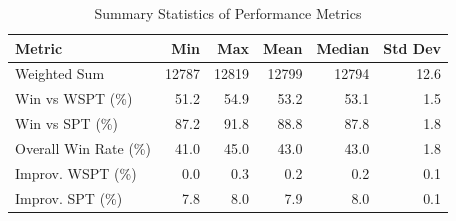 \begin{table}[htbp]%
\centering%
\begin{tabular}{lrrrrr}%
\toprule%
\textbf{Metric}&\textbf{Min}&\textbf{Max}&\textbf{Mean}&\textbf{Median}&\textbf{Std Dev}\\%
\midrule%
Weighted Sum&12787&12819&12799&12794&12.6\\%
Win vs WSPT (\%)&51.2&54.9&53.2&53.1&1.5\\%
Win vs SPT (\%)&87.2&91.8&88.8&87.8&1.8\\%
Overall Win Rate (\%)&41.0&45.0&43.0&43.0&1.8\\%
Improv. WSPT (\%)&0.0&0.3&0.2&0.2&0.1\\%
Improv. SPT (\%)&7.8&8.0&7.9&8.0&0.1\\%
\bottomrule%
\end{tabular}%
\caption{Summary Statistics of Performance Metrics}%
\label{tab:metrics}%
\end{table}
